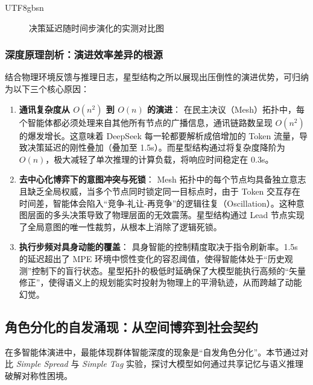 \documentclass[11pt,a4paper]{article}
\begin{document}
\begin{CJK*}{UTF8}{gbsn}
\begin{figure}[h!]
\caption{决策延迟随时间步演化的实测对比图}
\end{figure}



\subsubsection{深度原理剖析：演进效率差异的根源}
结合物理环境反馈与推理日志，星型结构之所以展现出压倒性的演进优势，可归纳为以下三个核心原因：

\begin{enumerate}
    \item \textbf{通讯复杂度从 $O(n^2)$ 到 $O(n)$ 的演进}：
    在民主决议（Mesh）拓扑中，每个智能体都必须处理来自其他所有节点的广播信息，通讯链路数呈现 $O(n^2)$ 的爆发增长。这意味着 DeepSeek 每一轮都要解析成倍增加的 Token 流量，导致决策延迟的刚性叠加（叠加至 1.5s）。而星型结构通过将复杂度降阶为 $O(n)$，极大减轻了单次推理的计算负载，将响应时间稳定在 0.3s。
    
    \item \textbf{去中心化博弈下的意图冲突与死锁}：
    Mesh 拓扑中的每个节点均具备独立意志且缺乏全局权威，当多个节点同时锁定同一目标点时，由于 Token 交互存在时间差，智能体会陷入“竞争-礼让-再竞争”的逻辑往复（Oscillation）。这种意图层面的多头决策导致了物理层面的无效震荡。星型结构通过 Lead 节点实现了全局意图的唯一性裁剪，从根本上消除了逻辑死锁。
    
    \item \textbf{执行步频对具身动能的覆盖}：
    具身智能的控制精度取决于指令刷新率。1.5s 的延迟超出了 MPE 环境中惯性变化的容忍阈值，使得智能体处于“历史观测”控制下的盲行状态。星型拓扑的极低时延确保了大模型能执行高频的“矢量修正”，使得语义上的规划能实时投射为物理上的平滑轨迹，从而跨越了动能幻觉。
\end{enumerate}

\subsection{角色分化的自发涌现：从空间博弈到社会契约}
在多智能体演进中，最能体现群体智能深度的现象是“自发角色分化”。本节通过对比 \textit{Simple Spread} 与 \textit{Simple Tag} 实验，探讨大模型如何通过共享记忆与语义推理破解对称性困境。


\end{CJK*}
\end{document}
